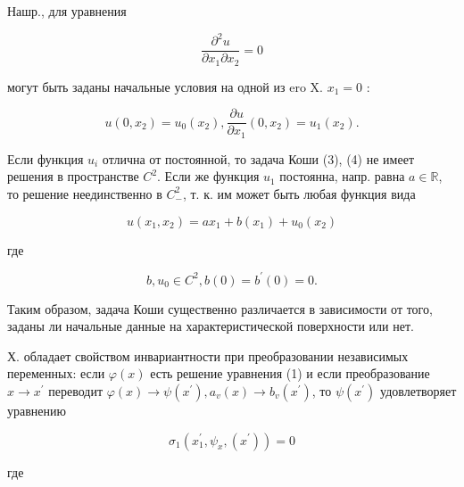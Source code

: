 \documentclass[10pt]{article}
\begin{document}
Нашр., для уравнения



\[

\frac{\partial^{2} u}{\partial x_{1} \partial x_{2}}=0

\]



могут быть заданы начальные условия на одной из ero X. $x_{1}=0$ :



\[

u\left(0, x_{2}\right)=u_{0}\left(x_{2}\right), \frac{\partial u}{\partial x_{1}}\left(0, x_{2}\right)=u_{1}\left(x_{2}\right) .

\]



Если функция $u_{i}$ отлична от постоянной, то задача Коши (3), (4) не имеет решения в пространстве $C^{2}$. Если же функция $u_{1}$ постоянна, напр. равна $a \in \mathbb{R}$, то решение неединственно в $C_{-}^{2}$, т. к. им может быть любая функция вида



\[

u\left(x_{1}, x_{2}\right)=a x_{1}+b\left(x_{1}\right)+u_{0}\left(x_{2}\right)

\]



где



\[

b, u_{0} \in C^{2}, b(0)=b^{\prime}(0)=0 .

\]



Таким образом, задача Коши существенно различается в зависимости от того, заданы ли начальные данные на характеристической поверхности или нет.



Х. обладает свойством инвариантности при преобразовании независимых переменных: если $\varphi(x)$ есть решение уравнения (1) и если преобразование $x \longrightarrow x^{\prime}$ переводит $\varphi(x) \longrightarrow \psi\left(x^{\prime}\right), a_{v}(x) \longrightarrow b_{v}\left(x^{\prime}\right)$, то $\psi\left(x^{\prime}\right)$ удовлетворяет уравнению



\[

\sigma_{1}\left(x_{1}^{\prime}, \psi_{x},\left(x^{\prime}\right)\right)=0

\]



где
\end{document}
